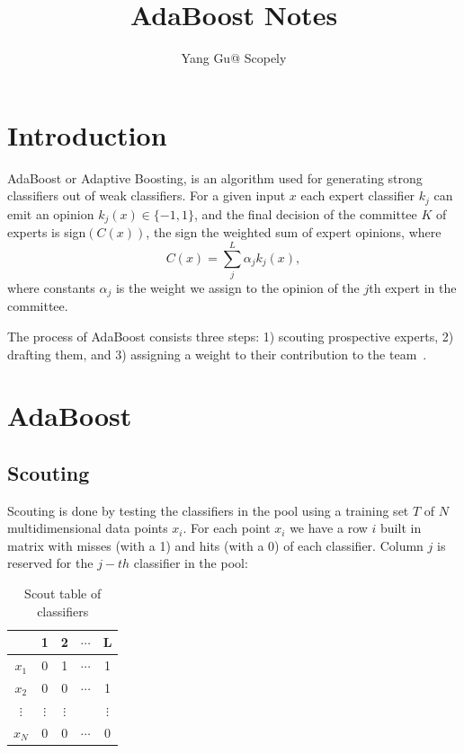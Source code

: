 \documentclass[]{article}  %
\begin{document}
\title{AdaBoost Notes}   %
\author{Yang Gu@ Scopely}         %
\maketitle
\setcounter{tocdepth}{2}

\tableofcontents
\newpage
{}


\section{Introduction}

AdaBoost or Adaptive Boosting, is an algorithm used for generating strong classifiers out of weak classifiers. For a given input $x$ each expert classifier $k_j$ can emit an opinion $k_j(x)\in \{-1,1\}$, and the final decision of the committee $K$ of experts is sign$(C(x))$, the sign the weighted sum of expert opinions, where
\[
C(x) = \sum_j^L \alpha_j k_j (x),
\]
where constants $\alpha_j$ is the weight we assign to the opinion of the $j$th expert in the committee. 

The process of AdaBoost consists three steps: 1) scouting prospective experts, 2) drafting them, and 3) assigning a weight to their contribution to the team~\cite{tutorial}.

\section{AdaBoost}

\subsection{Scouting}

Scouting is done by testing the classifiers in the pool using a training set $T$ of $N$ multidimensional data points $x_i$. For each point $x_i$ we have a row $i$ built in matrix with misses (with a 1) and hits (with a 0) of each classifier. Column $j$ is reserved for the $j-th$ classifier in the pool:

\begin{table}[htdp]
\caption{Scout table of classifiers}
\begin{center}
\begin{tabular}{c|cccc}
 & 1 & 2 & $\cdots$ & L\\
 \hline
$x_1$ & 0 & 1 & $\cdots$ & 1\\
$x_2$ & 0 & 0 & $\cdots$ & 1\\
$\vdots$ & $\vdots$ & $\vdots$ &  & $\vdots$ \\
$x_N$ & 0 & 0 & $\cdots$ & 0
\end{tabular}
\end{center}
\label{default}
\end{table}%
\end{document}
